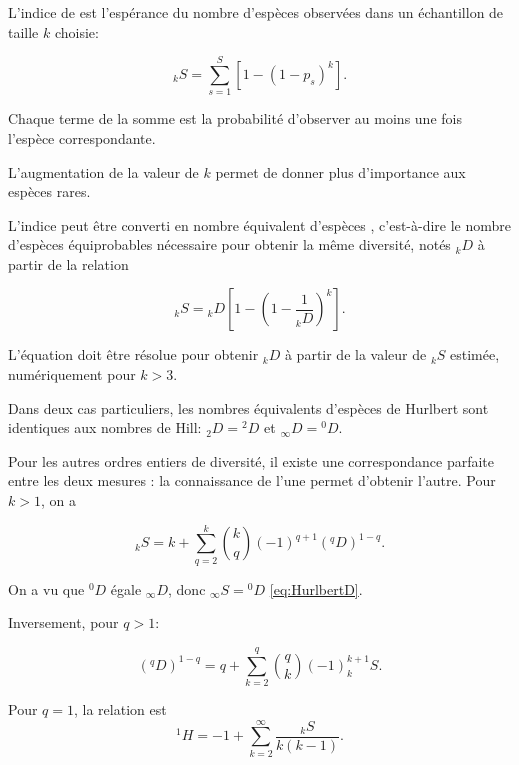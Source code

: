 \documentclass[
  11pt,
  french,
  a4paper,
  extrafontsizes,onecolumn,openright
  ]{memoir}
\newlength{\rf}
\begin{document}
L'indice de \textcite{Hurlbert1971} est l'espérance du nombre d'espèces observées dans un échantillon de taille \(k\) choisie:

\begin{equation}
  \label{eq:HurlbertSk}
  _{k}S = \sum^S_{s=1}{\left[1-{\left(1-p_s\right)}^k\right]}.
\end{equation}

Chaque terme de la somme est la probabilité d'observer au moins une fois l'espèce correspondante.

L'augmentation de la valeur de \(k\) permet de donner plus d'importance aux espèces rares.

L'indice peut être converti en nombre équivalent d'espèces \autocite{Dauby2012}, c'est-à-dire le nombre d'espèces équiprobables nécessaire pour obtenir la même diversité, notés \(_{k}D\) à partir de la relation

\begin{equation}
  \label{eq:HurlbertD}
  _{k}S = {_{k}D} \left[1-{\left(1-\frac{1}{_{k}D}\right)}^k\right].
\end{equation}

L'équation doit être résolue pour obtenir \(_{k}D\) à partir de la valeur de \(_{k}S\) estimée, numériquement pour \(k>3\).

Dans deux cas particuliers, les nombres équivalents d'espèces de Hurlbert sont identiques aux nombres de Hill: \(_{2}D ={^{2}\!D}\) et \(_{\infty}D={^{0}\!D}\).

Pour les autres ordres entiers de diversité, il existe une correspondance parfaite entre les deux mesures \autocite[Annexe S2]{Chao2014}: la connaissance de l'une permet d'obtenir l'autre. Pour \(k>1\), on a \autocite{Leinster2012}

\begin{equation}
  \label{eq:HurlbertDq}
  _{k}S = k + \sum_{q=2}^{k}{\binom{k}{q} (-1)^{q+1} (^{q}\!D)^{1-q}}.
\end{equation}

On a vu que \(^{0}\!D\) égale \(_{\infty}D\), donc \(_{\infty}S={^{0}\!D}\) \eqref{eq:HurlbertD}.

Inversement, pour \(q>1\):

\begin{equation}
  \label{eq:DqHurlbert}
  (^{q}\!D)^{1-q} = q + \sum_{k=2}^{q}{\binom{q}{k} (-1)^{k+1} _{k}S}.
\end{equation}

Pour \(q=1\), la relation est \autocite{Mao2007}
\begin{equation}
  \label{eq:Mao2007}
  ^{1}\!H = -1 + \sum_{k=2}^{\infty}{\frac{_{k}S}{k(k-1)}}.
\end{equation}
\end{document}
